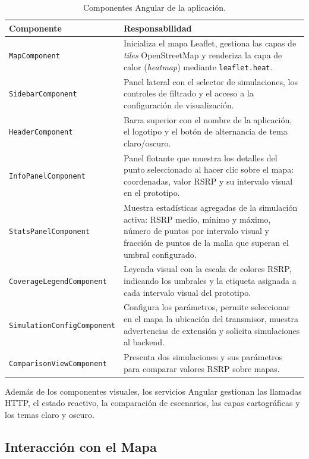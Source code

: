 \begin{table}[H]
\centering
\caption{Componentes Angular de la aplicación.}
\label{tab:componentes}
\begin{tabular}{|l|p{8.5cm}|}
\hline
\textbf{Componente} & \textbf{Responsabilidad} \\
\hline
\texttt{MapComponent} &
  Inicializa el mapa Leaflet, gestiona las capas de \textit{tiles} OpenStreetMap y
  renderiza la capa de calor (\textit{heatmap}) mediante \texttt{leaflet.heat}. \\
\hline
\texttt{SidebarComponent} &
  Panel lateral con el selector de simulaciones, los controles de filtrado y el acceso
  a la configuración de visualización. \\
\hline
\texttt{HeaderComponent} &
  Barra superior con el nombre de la aplicación, el logotipo y el botón de alternancia
  de tema claro/oscuro. \\
\hline
\texttt{InfoPanelComponent} &
  Panel flotante que muestra los detalles del punto seleccionado al hacer clic sobre el
  mapa: coordenadas, valor RSRP y su intervalo visual en el prototipo. \\
\hline
\texttt{StatsPanelComponent} &
  Muestra estadísticas agregadas de la simulación activa: RSRP medio, mínimo y máximo,
  número de puntos por intervalo visual y fracción de puntos de la malla que superan el
  umbral configurado. \\
\hline
\texttt{CoverageLegendComponent} &
  Leyenda visual con la escala de colores RSRP, indicando los umbrales y la
  etiqueta asignada a cada intervalo visual del prototipo. \\
\hline
\texttt{SimulationConfigComponent} &
  Configura los parámetros, permite seleccionar en el mapa la ubicación del transmisor,
  muestra advertencias de extensión y solicita simulaciones al backend. \\
\hline
\texttt{ComparisonViewComponent} &
  Presenta dos simulaciones y sus parámetros para comparar valores RSRP sobre mapas. \\
\hline
\end{tabular}
\end{table}

Además de los componentes visuales, los servicios Angular gestionan las llamadas HTTP, el
estado reactivo, la comparación de escenarios, las capas cartográficas y los temas claro y
oscuro.

\subsection{Interacción con el Mapa}
\label{subsec:interaccion_mapa}

